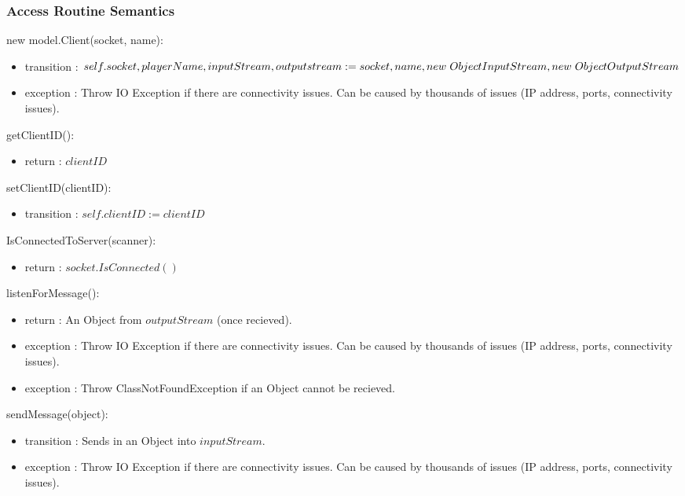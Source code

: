 \documentclass[12pt, titlepage]{article}
\begin{document}
    \subsubsection* {Access Routine Semantics}
    
        \noindent new model.Client(socket, name):
        \begin{itemize}
        \item transition : $self.socket, playerName, inputStream, outputstream := \\ socket, name, new \hspace{3px} ObjectInputStream, new \hspace{3px} ObjectOutputStream$
        \item exception : Throw IO Exception if there are connectivity issues. Can be caused by thousands of issues (IP address, ports, connectivity issues).
        \end{itemize}
        
        \noindent getClientID():
        \begin{itemize}
        \item return : $clientID$
        \end{itemize}
        
        \noindent setClientID(clientID):
        \begin{itemize}
        \item transition : $self.clientID := clientID$
        \end{itemize}
        
        \noindent IsConnectedToServer(scanner):
        \begin{itemize}
        \item return : $socket.IsConnected()$
        \end{itemize}
        
        \noindent listenForMessage():
        \begin{itemize}
        \item return : An Object from $outputStream$ (once recieved).
        \item exception : Throw IO Exception if there are connectivity issues. Can be caused by thousands of issues (IP address, ports, connectivity issues).
        \item exception : Throw ClassNotFoundException if an Object cannot be recieved.
        \end{itemize}
        
        \noindent sendMessage(object):
        \begin{itemize}
        \item transition : Sends in an Object into $inputStream$.
        \item exception : Throw IO Exception if there are connectivity issues. Can be caused by thousands of issues (IP address, ports, connectivity issues).
        \end{itemize}
        
\end{document}
